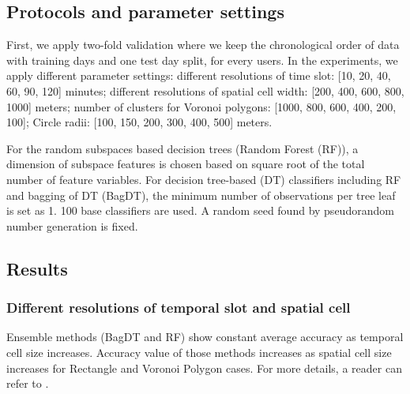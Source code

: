 \documentclass{sig-alternate}
\begin{document}
\subsection{Protocols and parameter settings} \label{paramsettings}
First, we apply two-fold validation where we keep the chronological order of data with  training days and one test day split,  for every users. In the experiments, we apply different parameter settings: different resolutions of time slot: [10, 20, 40, 60, 90, 120] minutes; different resolutions of spatial cell width: [200, 400, 600, 800, 1000] meters; number of clusters for Voronoi polygons: [1000, 800, 600, 400, 200, 100]; Circle radii: [100, 150, 200, 300, 400, 500] meters.

For the random subspaces based decision trees (Random Forest (RF)), a dimension of subspace features is chosen based on square root of the total number of feature variables. For decision tree-based (DT) classifiers including RF and bagging of DT (BagDT), the minimum number of observations per tree leaf is set as 1. 100 base classifiers are used. A random seed found by pseudorandom number generation is fixed.










\subsection{Results}

\subsubsection{Different resolutions of temporal slot and spatial cell}
Ensemble methods (BagDT and RF) show constant average accuracy as temporal cell size increases. Accuracy value of those methods increases as spatial cell size increases for Rectangle and Voronoi Polygon cases. For more details, a reader can refer to \cite{Kim2014ICPR}.
\end{document}
